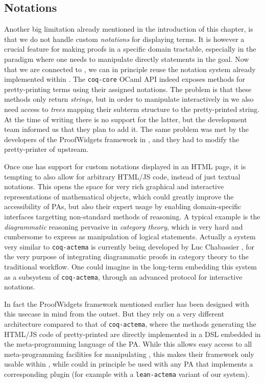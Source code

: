 \subsection{Notations}

Another big limitation already mentioned in the introduction of this chapter, is
that we do not handle custom \emph{notations} for displaying
terms. It is however a crucial feature for making proofs in a specific
domain tractable, especially in the  paradigm where one needs to
manipulate directly statements in the goal. Now that we are connected to , we
can in principle reuse the notation system already implemented within . The
\texttt{coq-core} OCaml API indeed exposes methods for pretty-printing  terms
using their assigned notations. The problem is that these methods only return
\emph{strings}, but in order to manipulate  interactively in  we also
need access to \emph{trees} mapping their subterm structure to the
pretty-printed string. At the time of writing there is no support for the
latter, but the  development team informed us that they plan to add it. The
same problem was met by the developers of the ProofWidgets framework in ,
and they had to modify the pretty-printer of  upstream.

Once one has support for custom notations displayed in an HTML page, it is
tempting to also allow for arbitrary HTML/JS code, instead of just textual
notations. This opens the space for very rich graphical and interactive
representations of mathematical objects, which could greatly improve the
accessibility of PAs, but also their expert usage by enabling domain-specific
interfaces targetting non-standard methods of reasoning. A typical example is
the \emph{diagrammatic} reasoning pervasive in \emph{category theory}, which is
very hard and cumbersome to express as manipulation of logical statements.
Actually a system very similar to \texttt{coq-actema} is currently being
developed by Luc Chabassier \cite{LucTalk}, for the very purpose of integrating
diagrammatic proofs in category theory to the traditional  workflow.
One could imagine in the long-term embedding this system as a subsystem of
\texttt{coq-actema}, through an advanced protocol for interactive notations.

In fact the ProofWidgets framework mentioned earlier has been designed with this
usecase in mind from the outset. But they rely on a very different architecture
compared to that of \texttt{coq-actema}, where the methods generating the
HTML/JS code of pretty-printed  are directly implemented in a DSL embedded
in the meta-programming language of the PA. While this allows easy access to all
meta-programming facilities for manipulating , this makes their framework
only usable within , while  could in principle be used with any PA
that implements a corresponding plugin (for example with a \texttt{lean-actema}
variant of our system).

